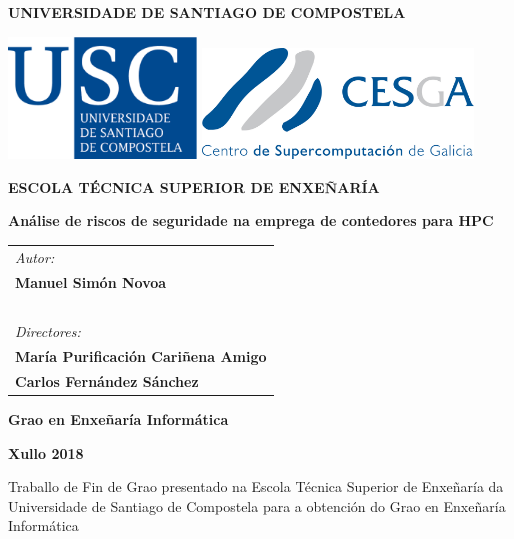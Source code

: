 \pagestyle{empty}
\begin{center}
{\bf\Large UNIVERSIDADE DE SANTIAGO DE COMPOSTELA}

\vspace{0.5cm}
\includegraphics[width=5cm]{figuras/logo_usc.eps}
\hspace{0.5cm}
\includegraphics[width=7.2cm]{figuras/logo_cesga}

\vspace{0.5cm}
{\bf\large ESCOLA TÉCNICA SUPERIOR DE ENXEÑARÍA}

\vspace{2cm}
{\bf\LARGE Análise de riscos de seguridade na emprega de contedores para HPC}

\vspace{0.5cm}

\end{center}

\vspace{2cm}
\hspace{1cm}\begin{tabular}{l}
{\it\Large Autor:} \\
{\bf\Large Manuel Simón Novoa} \\
~ \\
{\it\Large Directores:} \\
{\bf\Large María Purificación Cariñena Amigo} \\
{\bf\Large Carlos Fernández Sánchez} \\
\end{tabular}

\vspace{2cm}
\begin{center}
{\bf\Large Grao en Enxeñaría Informática}

\vspace{0.5cm}
{\bf\large Xullo 2018}

\vspace{0.5cm}
Traballo de Fin de Grao presentado na Escola Técnica Superior de Enxeñaría da Universidade de Santiago de Compostela para a obtención do Grao en Enxeñaría Informática
\end{center}

